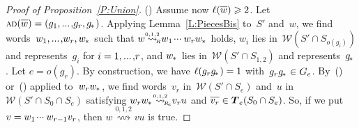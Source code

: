 \documentclass{amsart}
\numberwithin{equation}{section}
\theoremstyle{plain}
\theoremstyle{definition}
\let\ge=\geqslant
\newcounter{ITEM}
\begin{document}
\begin{proof}[Proof of Proposition~\ref{P:Union}]
{\setcounter{ITEM}{3}\leavevmode\hbox{\rm()}} Assume now ${\ell({{\overline{\vrule width0pt height5pt{w}}}})} \ge 2$. Let ${{\scriptstyle\mathrm{A\hspace{-0.1ex}D}}({{\overline{\vrule width0pt height5pt{w}}}})} = ({g}_1 {, ...\hspace{0.2ex},} {g}_{r}, {{g}_{\hspace{-0.2ex}*\hspace{0.2ex}}} )$. Applying Lemma~\ref{L:PiecesBis} to~${S}'$ and~${w}$, we find words~${w}_1 {, ...\hspace{0.2ex},} {w}_{r}, {{w}_{\hspace{-0.1ex}*\hspace{0.2ex}}}$ such that ${w} {\mathrel{{\mathrel{\overset{\scriptscriptstyle 0,1,2}{\rightsquigarrow}}}_{\hspace{-0.9ex}{\scriptscriptstyle R}}}} {w}_1 {\hspace{0.2ex}{\cdot}{\cdot}{\cdot}\hspace{0.5ex}} {w}_{r} {{w}_{\hspace{-0.1ex}*\hspace{0.2ex}}}$ holds, ${w}_{i}$ lies in~${\mathcal{W}({{S}' \cap {S}_{{o({{g}_{i}})}}})}$ and represents~${g}_{i}$ for ${i} = 1 {, ...\hspace{0.2ex},} {r}$, and ${{w}_{\hspace{-0.1ex}*\hspace{0.2ex}}}$ lies in~${\mathcal{W}({{S}' \cap {S}_{1,2}})}$ and represents~${{g}_{\hspace{-0.2ex}*\hspace{0.2ex}}}$. Let ${e} = {o({{g}_{r}})}$. By construction, we have ${\ell({{g}_{r} {{g}_{\hspace{-0.2ex}*\hspace{0.2ex}}}})} = 1$ with~${g}_{r} {{g}_{\hspace{-0.2ex}*\hspace{0.2ex}}} \in {G}_{e}$. By~{\setcounter{ITEM}{1}\leavevmode\hbox{\rm()}} or~{\setcounter{ITEM}{2}\leavevmode\hbox{\rm()}} applied to~${w}_{r} {{w}_{\hspace{-0.1ex}*\hspace{0.2ex}}}$, we find words~${v}_{r}$ in~${\mathcal{W}({{S}' \cap {S}_{e}})}$ and~${u}$ in~${\mathcal{W}({{S}' \cap {S}_0 \cap {S}_{e}})}$ satisfying ${w}_{r} {{w}_{\hspace{-0.1ex}*\hspace{0.2ex}}} {\mathrel{{\mathrel{\overset{\scriptscriptstyle 0,1,2}{\rightsquigarrow}}}_{\hspace{-0.9ex}{\scriptscriptstyle R}_{\hspace{-0.2ex}e}}}} {v}_{r} {u}$ and ${\overline{\vrule width0pt height5pt{{v}_{r}}}} \in {\boldsymbol{T}}_{e}({S}_0 \cap {S}_{e})$. So, if we put ${v} = {w}_1 {\hspace{0.2ex}{\cdot}{\cdot}{\cdot}\hspace{0.5ex}} {w}_{{r}-1} {v}_{r}$, then ${w} {\mathrel{\overset{\scriptscriptstyle 0,1,2}{\rightsquigarrow}}} {v} {u}$ is true. 


\end{proof}
\end{document}
